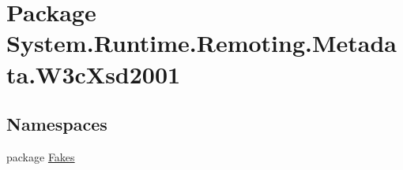 \hypertarget{namespace_system_1_1_runtime_1_1_remoting_1_1_metadata_1_1_w3c_xsd2001}{\section{Package System.\-Runtime.\-Remoting.\-Metadata.\-W3c\-Xsd2001}
\label{namespace_system_1_1_runtime_1_1_remoting_1_1_metadata_1_1_w3c_xsd2001}
}
\subsection*{Namespaces}
\begin{DoxyCompactItemize}
\item 
package \hyperlink{namespace_system_1_1_runtime_1_1_remoting_1_1_metadata_1_1_w3c_xsd2001_1_1_fakes}{Fakes}
\end{DoxyCompactItemize}
